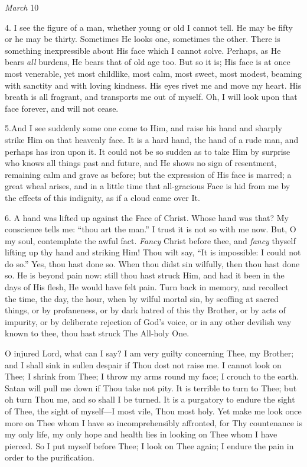 \emph{March}
10

4. I see the figure of a man,
whether young or old I cannot tell. He may be fifty or he may be thirty.
Sometimes He looks one, sometimes the other. There is something
inexpressible about His face which I cannot solve. Perhaps, as He bears \emph{all}
burdens, He bears that of old age too. But so it is; His face is at once
most venerable, yet most childlike, most calm, most sweet, most modest,
beaming with sanctity and with loving kindness. His eyes rivet me and
move my heart. His breath is all fragrant, and transports me out of
myself. Oh, I will look upon that face forever, and will not cease.

5.\emph{}And I see suddenly
some one come to Him, and raise his hand and sharply strike Him on that
heavenly face. It is a hard hand, the hand of a rude man, and perhaps
has iron upon it. It could not be so sudden as to take Him by
surprise who knows all things past and future, and He shows no sign of
resentment, remaining calm and grave as before; but the expression of
His face is marred; a great wheal arises, and in a little time that
all-gracious Face is hid from me by the effects of this indignity, as if
a cloud came over It.

6. A hand was lifted up against
the Face of Christ. Whose hand was that? My conscience tells me: ``thou
art the man.'' I trust it is not so with me now. But, O my soul,
contemplate the awful fact. \emph{Fancy} Christ before thee, and \emph{fancy}
thyself lifting up thy hand and striking Him! Thou wilt say, ``It is
impossible: I could not do so.'' Yes, thou hast done so. When thou didst
sin wilfully, then thou hast done so. He is beyond pain now: still thou
hast struck Him, and had it been in the days of His flesh, He would have
felt pain. Turn back in memory, and recollect the time, the day, the
hour, when by wilful mortal sin, by scoffing at sacred things, or by
profaneness, or by dark hatred of this thy Brother, or by acts of
impurity, or by deliberate rejection of God's voice, or in any other
devilish way known to thee, thou hast struck The All-holy One.

O injured Lord, what can I say?
I am very guilty concerning Thee, my Brother; and I shall sink in sullen
despair if Thou dost not raise me. I cannot look on Thee; I shrink from
Thee; I throw my arms round my face; I crouch to the earth. Satan will
pull me down if Thou take not pity. It is terrible to turn to Thee; but
oh turn Thou me, and so shall I be turned. It is a purgatory to
endure the sight of Thee, the sight of myself—I most vile, Thou most
holy. Yet make me look once more on Thee whom I have so incomprehensibly
affronted, for Thy countenance is my only life, my only hope and health
lies in looking on Thee whom I have pierced. So I put myself before
Thee; I look on Thee again; I endure the pain in order to the
purification.

